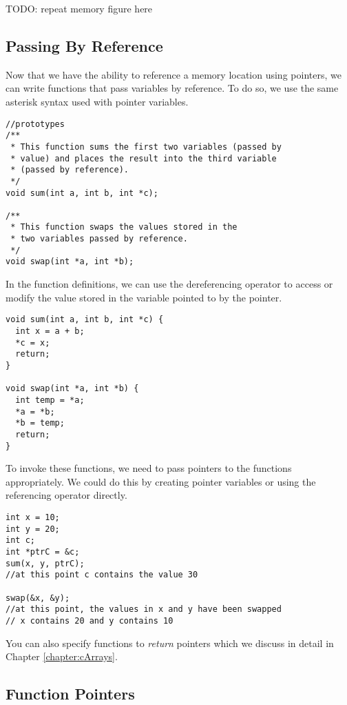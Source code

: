 TODO: repeat memory figure here


\subsection{Passing By Reference}

Now that we have the ability to reference a memory location 
using pointers, we can write functions that pass variables by 
reference.  To do so, we use the same asterisk syntax used
with pointer variables.

\begin{verbatim}
//prototypes
/**
 * This function sums the first two variables (passed by
 * value) and places the result into the third variable 
 * (passed by reference).
 */
void sum(int a, int b, int *c);

/**
 * This function swaps the values stored in the
 * two variables passed by reference.
 */
void swap(int *a, int *b);
\end{verbatim}

In the function definitions, we can use the dereferencing
operator to access or modify the value stored in the
variable pointed to by the pointer.  

\begin{verbatim}
void sum(int a, int b, int *c) {
  int x = a + b;
  *c = x;
  return;
}

void swap(int *a, int *b) {
  int temp = *a;
  *a = *b;
  *b = temp;
  return;
}
\end{verbatim}

To invoke these functions, we need to pass pointers to 
the functions appropriately.  We could do this by
creating pointer variables or using the referencing operator
directly.

\begin{verbatim}
int x = 10;
int y = 20;
int c;
int *ptrC = &c;
sum(x, y, ptrC);
//at this point c contains the value 30

swap(&x, &y);
//at this point, the values in x and y have been swapped
// x contains 20 and y contains 10
\end{verbatim}

You can also specify functions to \emph{return} pointers
which we discuss in detail in Chapter \ref{chapter:cArrays}.

\subsection{Function Pointers}


